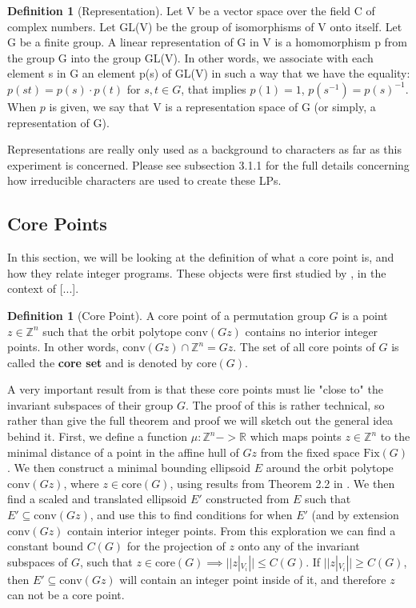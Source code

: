 \documentclass[11pt]{article} %
\theoremstyle{definition}
\newtheorem{definition}[theorem]{Definition}
\theoremstyle{remark}
\newcommand{\ZZ}{\mathbb{Z}}
\newcommand{\RR}{\mathbb{R}}
\begin{document}
\begin{definition} [Representation]
Let V be a vector space over the field C of complex numbers.
Let GL(V) be the group of isomorphisms of V onto itself.
Let G be a finite group.
A linear representation of G in V is a homomorphism p from the group G into the group GL(V). In other words, we associate with each element s in G an element p(s) of GL(V) in such a way that we have the equality: $ p(st) = p(s) \cdot p(t)$ for $s, t \in G$, that implies $p(1) = 1$, $p(s^{-1}) = p(s)^{-1}$. When $p$ is given, we say that V is a representation space of G (or simply, a representation of G).
\end{definition}

Representations are really only used as a background to characters as far as this experiment is concerned. Please see subsection 3.1.1 for the full details concerning how irreducible characters are used to create these LPs. 
\subsection{Core Points}

In this section, we will be looking at the definition of what a core point is, and how they relate integer programs. These objects were first studied by \cite{some}, in the context of [...].

\begin{definition}[Core Point]
A core point of a permutation group $G$ is a point $z \in \mathbb{Z}^n$ such that the orbit polytope $\textrm{conv}(Gz)$ contains no interior integer points. In other words, $\textrm{conv}(Gz) \cap \mathbb{Z}^n = Gz$. The set of all core points of $G$ is called the \textbf{core set} and is denoted by $\textrm{core}(G)$.
\end{definition}

A very important result from \cite{rehn} is that these core points must lie "close to" the invariant subspaces of their group $G$. The proof of this is rather technical, so rather than give the full theorem and proof we will sketch out the general idea behind it. First, we define a function $\mu : \ZZ^n -> \RR$ which maps points $z \in \ZZ^n$ to the minimal distance of a point in the affine hull of $Gz$ from the fixed space $\textrm{Fix}(G)$. We then construct a minimal bounding ellipsoid $E$ around the orbit polytope $\textrm{conv}(Gz)$, where $z \in \textrm{core}(G)$, using results from Theorem 2.2 in \cite{barvinok/blekherman}. We then find a scaled and translated ellipsoid $E'$ constructed from $E$ such that $E' \subseteq \textrm{conv}(Gz)$, and use this to find conditions for when $E'$ (and by extension $\textrm{conv}(Gz)$ contain interior integer points. From this exploration we can find a constant bound $C(G)$ for the projection of $z$ onto any of the invariant subspaces of $G$, such that $z \in \textrm{core}(G) \implies  ||z|_{V_i}|| \leq C(G)$. If $||z|_{V_i}|| \geq C(G)$, then $E' \subseteq \textrm{conv}(Gz)$ will contain an integer point inside of it, and therefore $z$ can not be a core point.
\end{document}
